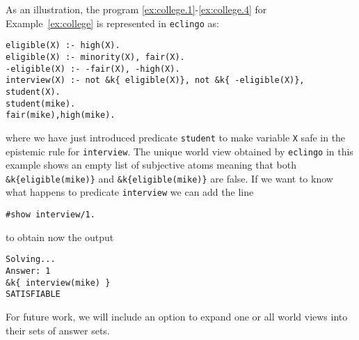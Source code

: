 \documentclass{new_tlp}
\def\eclingo{{\tt eclingo}}
\def\clingo{{\tt clingo}}
\begin{document}
As an illustration, the program \eqref{ex:college.1}-\eqref{ex:college.4} for Example~\ref{ex:college} is represented in \eclingo{} as:
\begin{Verbatim}[frame=single]
eligible(X) :- high(X).
eligible(X) :- minority(X), fair(X).
-eligible(X) :- -fair(X), -high(X).
interview(X) :- not &k{ eligible(X)}, not &k{ -eligible(X)}, student(X).
student(mike).
fair(mike),high(mike).
\end{Verbatim}
where we have just introduced predicate {\tt student} to make variable {\tt X} safe in the epistemic rule for {\tt interview}.
%
The unique world view obtained by \eclingo{} in this example shows an empty list of subjective atoms meaning that both \mbox{\tt \&k\{eligible(mike)\}} and \mbox{\tt \&k\{eligible(mike)\}} are false.
%
If we want to know what happens to predicate {\tt interview} we can add the line
\begin{Verbatim}[frame=single]
#show interview/1.
\end{Verbatim}
to obtain now the output
\begin{Verbatim}[frame=single]
Solving...
Answer: 1
&k{ interview(mike) }
SATISFIABLE
\end{Verbatim}
For future work, we will include an option to expand one or all world views into their sets of answer sets.
\end{document}
